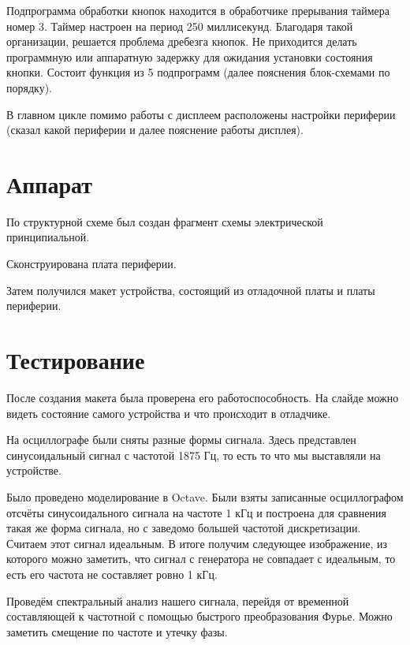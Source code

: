 \documentclass[a4paper, 14pt]{extarticle}
\begin{document}
	Подпрограмма обработки кнопок находится в обработчике прерывания таймера номер 3. Таймер настроен на период 250 миллисекунд. Благодаря такой организации, решается проблема дребезга кнопок. Не приходится делать программную или аппаратную задержку для ожидания установки состояния кнопки. Состоит функция из 5 подпрограмм (далее пояснения блок-схемами по порядку).
	
	В главном цикле помимо работы с дисплеем расположены настройки периферии (сказал какой периферии и далее пояснение работы дисплея).
	
\section*{Аппарат}
	По структурной схеме был создан фрагмент схемы электрической принципиальной.
	
	Сконструирована плата периферии. 
	 
	Затем получился макет устройства, состоящий из отладочной платы и платы периферии.
	
\section*{Тестирование}
	После создания макета была проверена его работоспособность. На слайде можно видеть состояние самого устройства и что происходит в отладчике.
	
	На осциллографе были сняты разные формы сигнала. Здесь представлен синусоидальный сигнал с частотой 1875 Гц, то есть то что мы выставляли на устройстве. 
	
	Было проведено моделирование в Octave. Были взяты записанные осциллографом отсчёты синусоидального сигнала на частоте 1 кГц и построена для сравнения такая же форма сигнала, но с заведомо большей частотой дискретизации. Считаем этот сигнал идеальным. В итоге получим следующее изображение, из которого можно заметить, что сигнал с генератора не совпадает с идеальным, то есть его частота не составляет ровно 1 кГц.
	
	Проведём спектральный анализ нашего сигнала, перейдя от временной составляющей к частотной с помощью быстрого преобразования Фурье. Можно заметить смещение по частоте и утечку фазы.
\end{document}
